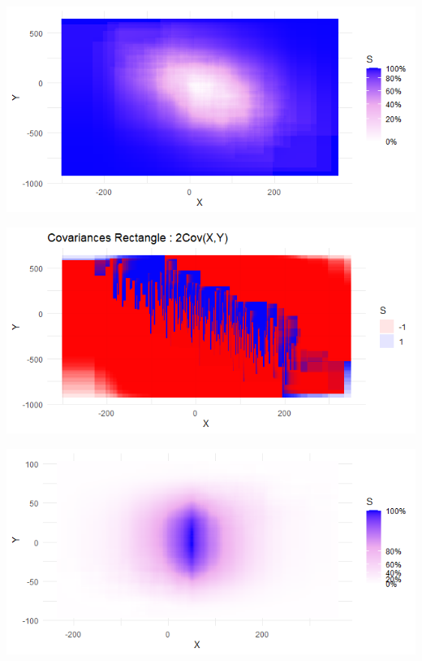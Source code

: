 \documentclass[
]{report}
\begin{document}
\begin{minipage}{0.45\textwidth}
\centering
  \includegraphics{graph_plotnetrec_normal.png}
\end{minipage} 
\hspace{3.5ex}
\begin{minipage}{0.45\textwidth}
\centering
    \includegraphics{plot_rect_normal.png}
\end{minipage}
\begin{minipage}{0.45\textwidth}
\centering
    \includegraphics{graph_plotnetrec_heterogene.png}
\end{minipage} 
\hspace{3.5ex}
\end{document}
